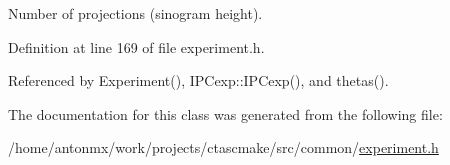 Number of projections (sinogram height). 



Definition at line 169 of file experiment.h.



Referenced by Experiment(), IPCexp::IPCexp(), and thetas().



The documentation for this class was generated from the following file:\begin{DoxyCompactItemize}
\item 
/home/antonmx/work/projects/ctascmake/src/common/\hyperlink{experiment_8h}{experiment.h}\end{DoxyCompactItemize}
